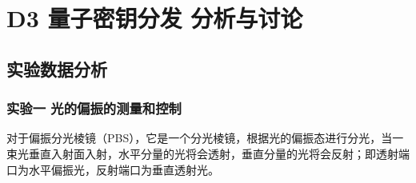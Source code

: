 \documentclass[dvipsnames, svgnames,a4paper,11pt]{article}
\begin{document}
\section{D3 \quad 量子密钥分发 \quad\heiti 分析与讨论}

\subsection{实验数据分析}


	\subsubsection{实验一 \quad 光的偏振的测量和控制}

		对于偏振分光棱镜（PBS），它是一个分光棱镜，根据光的偏振态进行分光，当一束光垂直入射面入射，水平分量的光将会透射，垂直分量的光将会反射；即透射端口为水平偏振光，反射端口为垂直透射光。
		
\end{document}
